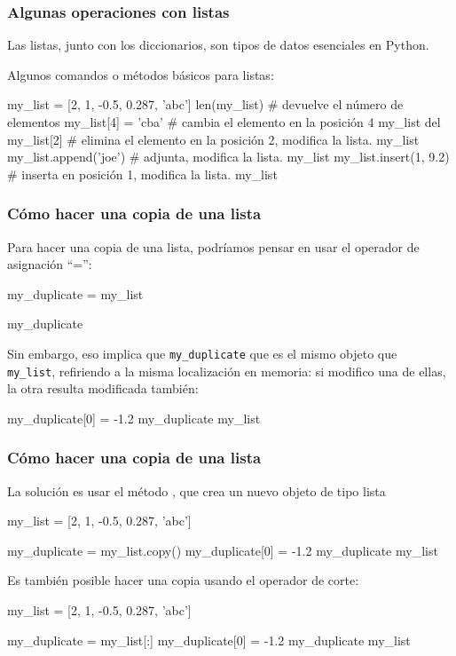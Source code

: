 \documentclass[handout,9pt]{beamer}
\begin{document}
\begin{frame}[fragile]
  \frametitle{Algunas operaciones con listas}
  \begin{block}{}
    Las listas, junto con los diccionarios, son tipos de datos
    esenciales en Python.
  \end{block} \pause
  Algunos comandos o métodos básicos para listas: \pause
    \begin{pyconsole}
my_list = [2, 1, -0.5, 0.287, 'abc']      
len(my_list) # devuelve el número de elementos
my_list[4] = 'cba' # cambia el elemento en la posición 4
my_list
del my_list[2] # elimina el elemento en la posición 2, modifica la lista.
my_list
my_list.append('joe') # adjunta, modifica la lista.
my_list
my_list.insert(1, 9.2) # inserta en posición 1, modifica la lista.
my_list
\end{pyconsole}

\end{frame}

\begin{frame}[fragile]
  \frametitle{Cómo hacer una copia de una lista}
  \begin{block}{}
  Para hacer una copia de una lista, podríamos pensar en usar el
  operador de asignación  ``='':
  \begin{pyconsole}
my_duplicate = my_list
\end{pyconsole}
\begin{pyconsole}[copy0]
my_duplicate
\end{pyconsole}
  \end{block}
\pause
Sin embargo, eso implica que {\tt my\_duplicate} que es el mismo
objeto que  {\tt
  my\_list}, refiriendo a la misma localización en memoria: si
modifico una de ellas, la otra resulta modificada también:
\begin{pyconsole}[copy0]
my_duplicate[0] = -1.2
my_duplicate
my_list
\end{pyconsole}
\end{frame}

\begin{frame}[fragile]
  \frametitle{Cómo hacer una copia de una lista}

La solución es usar el método , que crea un nuevo objeto de
tipo lista \pause
  \begin{pyconcode}[copy1]
my_list = [2, 1, -0.5, 0.287, 'abc']      
\end{pyconcode}
\begin{pyconsole}[copy1]
my_duplicate = my_list.copy()
my_duplicate[0] = -1.2
my_duplicate
my_list
\end{pyconsole}
\pause
Es también posible hacer una copia usando el operador de corte: \pause
\begin{pyconcode}[copy1]
my_list = [2, 1, -0.5, 0.287, 'abc']      
\end{pyconcode}
\begin{pyconsole}[copy1]
my_duplicate = my_list[:]
my_duplicate[0] = -1.2
my_duplicate
my_list
\end{pyconsole}

\end{frame}
\end{document}
